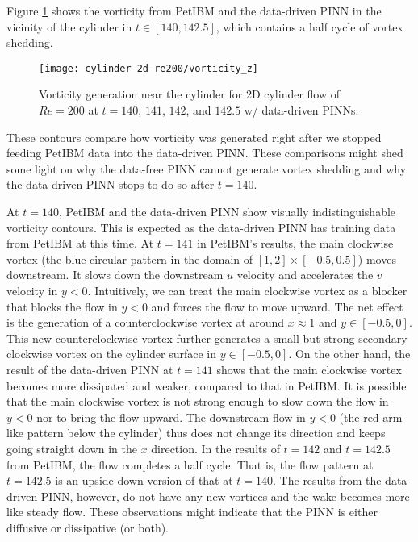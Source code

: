 Figure \ref{fig:cylinder-re200-pinn-vort-gen} shows the vorticity from PetIBM and the data-driven PINN in the vicinity of the cylinder in $t \in [140, 142.5]$, which contains a half cycle of vortex shedding.
\begin{figure}
    \centering%
    \texttt{[image: cylinder-2d-re200/vorticity\_z]}%
    \caption{%
        Vorticity generation near the cylinder for 2D cylinder flow of $Re=\num{200}$ at $t=140$, $141$, $142$, and $142.5$ w/ data-driven PINNs.
    }
    \label{fig:cylinder-re200-pinn-vort-gen}%
\end{figure}
These contours compare how vorticity was generated right after we stopped feeding PetIBM data into the data-driven PINN.
These comparisons might shed some light on why the data-free PINN cannot generate vortex shedding and why the data-driven PINN stops to do so after $t=140$.

At $t=140$, PetIBM and the data-driven PINN show visually indistinguishable vorticity contours.
This is expected as the data-driven PINN has training data from PetIBM at this time.
At $t=141$ in PetIBM's results, the main clockwise vortex (the blue circular pattern in the domain of $[1, 2]\times[-0.5, 0.5]$) moves downstream.
It slows down the downstream $u$ velocity and accelerates the $v$ velocity in $y<0$.
Intuitively, we can treat the main clockwise vortex as a blocker that blocks the flow in $y<0$ and forces the flow to move upward.
The net effect is the generation of a counterclockwise vortex at around $x\approx 1$ and $y \in [-0.5, 0]$.
This new counterclockwise vortex further generates a small but strong secondary clockwise vortex on the cylinder surface in $y\in[-0.5, 0]$.
On the other hand, the result of the data-driven PINN at $t=141$ shows that the main clockwise vortex becomes more dissipated and weaker, compared to that in PetIBM.
It is possible that the main clockwise vortex is not strong enough to slow down the flow in $y<0$ nor to bring the flow upward.
The downstream flow in $y<0$ (the red arm-like pattern below the cylinder) thus does not change its direction and keeps going straight down in the $x$ direction.
In the results of $t=142$ and $t=142.5$ from PetIBM, the flow completes a half cycle.
That is, the flow pattern at $t=142.5$ is an upside down version of that at $t=140$.
The results from the data-driven PINN, however, do not have any new vortices and the wake becomes more like steady flow.
These observations might indicate that the PINN is either diffusive or dissipative (or both).

